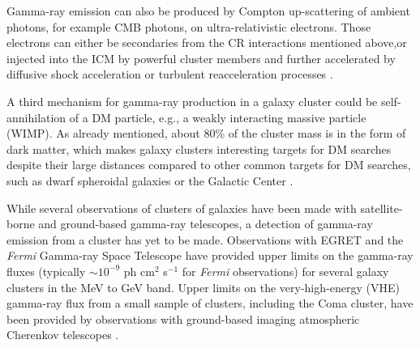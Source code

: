 \documentclass[12pt,manuscript]{aastex}
\def\Fermi{{\em Fermi}\xspace}
\begin{document}
Gamma-ray emission can also be produced by Compton up-scattering of ambient photons, for example
CMB photons, on ultra-relativistic electrons. Those electrons can either be secondaries from the
CR interactions mentioned above,or injected into the ICM by powerful cluster members and
further accelerated by diffusive shock acceleration or turbulent reacceleration processes
\citep[][and references therein]{article:SchlickeiserSieversThiemann:1987}.

A third mechanism for gamma-ray production in a galaxy cluster could be self-annihilation of a DM
particle, e.g., a weakly interacting massive particle (WIMP). As already mentioned, about 80\% of
the cluster mass is in the form of dark matter, which makes galaxy clusters interesting targets for
DM searches \citep{article:EvansFerrerSarkar:2004, article:BergstromHooper:2006,
article:PinzkePfrommerBergstrom2009, article:Cuesta_etal:2011} despite their large distances
compared to other common targets for DM searches, such as dwarf spheroidal galaxies
\citep{article:Strigari_etal:2007, article:Acciari_etal:2010, article:Aliu_etal:2009} or the
Galactic Center \citep{article:Kosack_etal:2004, article:Aharonian_etal:2006,
article:Aharonian_etal:2009b, article:Abramowski_etal:2011}. 

While several observations of clusters of galaxies have been made with satellite-borne and
ground-based gamma-ray telescopes, a detection of gamma-ray emission from a cluster has yet to be
made. Observations with EGRET \citep{article:Sreekumar_etal:1996, article:Reimer_etal:2003} and the
\Fermi Gamma-ray Space Telescope \citep{article:Ackermann_etal:2010} have provided upper limits on
the gamma-ray fluxes (typically $\sim10^{-9}$ ph cm$^{2}$ s$^{-1}$ for \Fermi observations) for
several galaxy clusters in the MeV to GeV band. Upper limits on the very-high-energy (VHE)
gamma-ray flux from a small sample of clusters, including the Coma cluster, have been provided by
observations with ground-based imaging atmospheric Cherenkov telescopes
\citep[IACTs;][]{article:Perkins_etal:2006, inproc:Perkins_etal:2008, article:Aharonian_etal:2009a,
article:Aleksic_etal:2010,article:Aleksic_etal:2012}.
\end{document}
